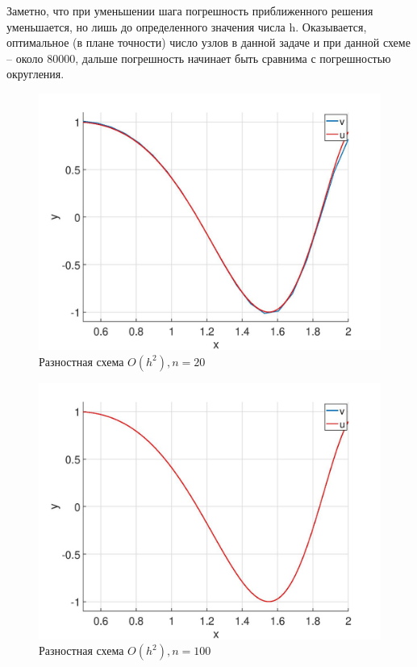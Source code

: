 \documentclass[12pt]{article}
\begin{document}
Заметно, что при уменьшении шага погрешность приближенного решения уменьшается, но лишь до определенного значения числа h. Оказывается, оптимальное (в плане точности) число узлов в данной задаче и при данной схеме – около 80000, дальше погрешность начинает быть сравнима с погрешностью округления.

\begin{figure}
\begin{center}
\includegraphics[scale = 0.6]{h2_20.jpg} 
\end{center}
\caption{Разностная схема $O(h^2), n = 20$ }
\end{figure}

\begin{figure}
\begin{center}
\includegraphics[scale = 0.6]{h2_100.jpg} 
\end{center}
\caption{Разностная схема $O(h^2), n = 100$ }
\end{figure}
\end{document}
